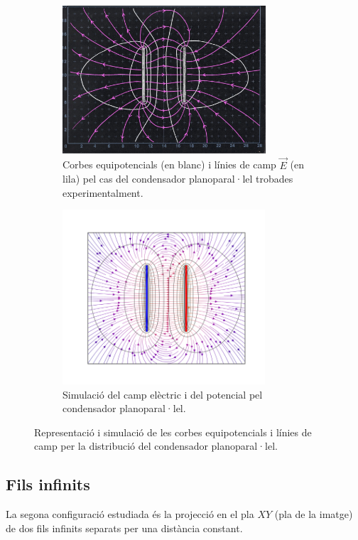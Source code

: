 \documentclass[a4paper,10.5pt]{report}
\begin{document}
\begin{figure}
	\centering
	\begin{subfigure}{0.45\linewidth}
		\centering
		\includegraphics[height=5.5cm]{dibplaques} %
		\caption{Corbes equipotencials (en blanc) i línies de camp $\vec{E}$ (en lila) pel cas del condensador planoparal·lel trobades experimentalment.}
		\label{fig:1.2a}
	\end{subfigure}
	\hfill
	\begin{subfigure}{0.53\linewidth}
		\centering
		\includegraphics[height=6.5cm]{figplaques1} %
		\caption{Simulació del camp elèctric i del potencial pel condensador planoparal·lel.}
		\label{fig:1.2b}
	\end{subfigure}
	\caption{Representació i simulació de les corbes equipotencials i línies de camp per la distribució del condensador planoparal·lel.}
	\label{fig:1.2}
\end{figure}


\subsection{Fils infinits}
La segona configuració estudiada és la projecció en el pla $XY$ (pla de la imatge) de dos fils infinits separats per una distància constant. 
\end{document}
